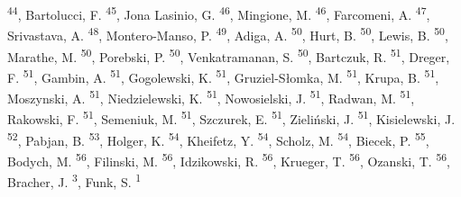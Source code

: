 \documentclass[
]{article}
\begin{document}
\textsuperscript{44}, Bartolucci, F. \textsuperscript{45}, Jona Lasinio, G. \textsuperscript{46}, Mingione, M. \textsuperscript{46}, Farcomeni, A. \textsuperscript{47}, Srivastava, A. \textsuperscript{48}, Montero-Manso, P. \textsuperscript{49}, Adiga, A. \textsuperscript{50}, Hurt, B. \textsuperscript{50}, Lewis, B. \textsuperscript{50}, Marathe, M. \textsuperscript{50}, Porebski, P. \textsuperscript{50}, Venkatramanan, S. \textsuperscript{50}, Bartczuk, R. \textsuperscript{51}, Dreger, F. \textsuperscript{51}, Gambin, A. \textsuperscript{51}, Gogolewski, K. \textsuperscript{51}, Gruziel-Słomka, M. \textsuperscript{51}, Krupa, B. \textsuperscript{51}, Moszynski, A. \textsuperscript{51}, Niedzielewski, K. \textsuperscript{51}, Nowosielski, J. \textsuperscript{51}, Radwan, M. \textsuperscript{51}, Rakowski, F. \textsuperscript{51}, Semeniuk, M. \textsuperscript{51}, Szczurek, E. \textsuperscript{51}, Zieliński, J. \textsuperscript{51}, Kisielewski, J. \textsuperscript{52}, Pabjan, B. \textsuperscript{53}, Holger, K. \textsuperscript{54}, Kheifetz, Y. \textsuperscript{54}, Scholz, M. \textsuperscript{54}, Biecek, P. \textsuperscript{55}, Bodych, M. \textsuperscript{56}, Filinski, M. \textsuperscript{56}, Idzikowski, R. \textsuperscript{56}, Krueger, T. \textsuperscript{56}, Ozanski, T. \textsuperscript{56}, Bracher, J. \textsuperscript{3}, Funk, S. \textsuperscript{1}
\end{document}
